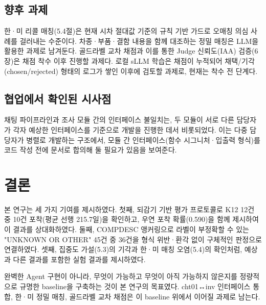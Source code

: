 \documentclass[11pt]{article}
\begin{document}
\subsection{향후 과제}

한·미 리콜 매칭(5.4절)은 현재 시차 절대값 기준의 규칙 기반 가드로 오매칭 의심 사례를 걸러내는 수준이다. 차종·부품·결함 내용을 함께 대조하는 정밀 매칭은 LLM을 활용한 과제로 남겨둔다. 골드라벨 교차 채점과 이를 통한 Judge 신뢰도(IAA) 검증(6장)은 채점 착수 이후 진행할 과제다. 로컬 sLLM 학습은 채점이 누적되어 채택/기각(chosen/rejected) 형태의 로그가 쌓인 이후에 검토할 과제로, 현재는 착수 전 단계다.

\subsection{협업에서 확인된 시사점}

채팅 파이프라인과 조사 모듈 간의 인터페이스 불일치는, 두 모듈이 서로 다른 담당자가 각자 예상한 인터페이스를 기준으로 개발을 진행한 데서 비롯되었다. 이는 다중 담당자가 병렬로 개발하는 구조에서, 모듈 간 인터페이스(함수 시그니처·입출력 형식)를 코드 작성 전에 문서로 합의해 둘 필요가 있음을 보여준다.

\section{결론}

본 연구는 세 가지 기여를 제시하였다. 첫째, 되감기 기반 평가 프로토콜로 K12 12건 중 10건 포착(평균 선행 215.7일)을 확인하고, 우연 포착 확률(0.590)을 함께 제시하여 이 결과를 상대화하였다. 둘째, COMPDESC 앵커링으로 라벨이 부정확할 수 있는 "UNKNOWN OR OTHER" 45건 중 36건을 형식 위반·환각 없이 구체적인 판정으로 연결하였다. 셋째, 집중도 가설(5.3)의 기각과 한·미 매칭 오염(5.4)의 확인처럼, 예상과 다른 결과를 포함한 실험 결과를 제시하였다.

완벽한 Agent 구현이 아니라, 무엇이 가능하고 무엇이 아직 가능하지 않은지를 정량적으로 규명한 baseline을 구축하는 것이 본 연구의 목표였다. cht01↔inv 인터페이스 통합, 한·미 정밀 매칭, 골드라벨 교차 채점은 이 baseline 위에서 이어질 과제로 남는다.



\end{document}
